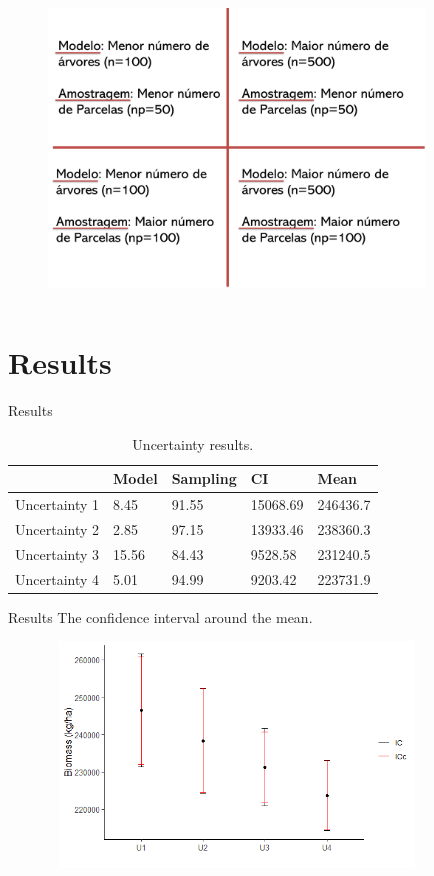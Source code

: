 \documentclass{beamer}
\begin{document}
\begin{frame}
\begin{figure}
        \centering
        \includegraphics[width = 10cm, height = 8cm]{pic/pratico.jpg}
        \end{figure}
\end{frame}

\section{Results}
\begin{frame}{Results}
\begin{table}[]
\caption{Uncertainty results.}
\begin{tabular}{lllll}
\hline
                & Model & Sampling & CI       & Mean     \\
                \hline
Uncertainty 1   & 8.45  & 91.55    & 15068.69 & 246436.7 \\
Uncertainty 2   & 2.85  & 97.15    & 13933.46 & 238360.3 \\
Uncertainty 3   & 15.56 & 84.43    & 9528.58  & 231240.5 \\
Uncertainty   4 & 5.01  & 94.99    & 9203.42  & 223731.9\\
\hline
\end{tabular}
\end{table}
\end{frame}



\begin{frame}{Results}
The confidence interval around the mean.
\begin{figure}
        \centering
        \includegraphics[width = 10cm, height = 6cm]{pic/resultado1.png}
        \end{figure}
\end{frame}
\end{document}
